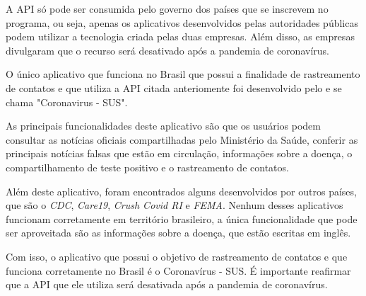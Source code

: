A API só pode ser consumida pelo governo dos países que se inscrevem no programa, ou seja, apenas os aplicativos desenvolvidos pelas autoridades públicas podem utilizar a tecnologia criada pelas duas empresas. Além disso, as empresas divulgaram que o recurso será desativado após a pandemia de coronavírus.

O único aplicativo que funciona no Brasil que possui a finalidade de rastreamento de contatos e que utiliza a API citada anteriomente foi desenvolvido pelo \textcite{CoronavirusSUS} e se chama "Coronavirus - SUS".

As principais funcionalidades deste aplicativo são que os usuários podem consultar as notícias oficiais compartilhadas pelo Ministério da Saúde, conferir as principais notícias falsas que estão em circulação, informações sobre a doença, o compartilhamento de teste positivo e o rastreamento de contatos.

Além deste aplicativo, foram encontrados alguns desenvolvidos por outros países, que são o \textit{CDC}, \textit{Care19}, \textit{Crush Covid RI} e \textit{FEMA}. Nenhum desses aplicativos funcionam corretamente em território brasileiro, a única funcionalidade que pode ser aproveitada são as informações sobre a doença, que estão escritas em inglês.

Com isso, o aplicativo que possui o objetivo de rastreamento de contatos e que funciona corretamente no Brasil é o Coronavírus - SUS. É importante reafirmar que a API que ele utiliza será desativada após a pandemia de coronavírus.